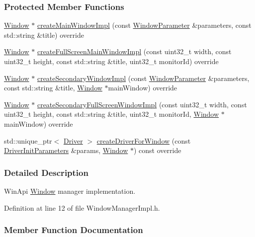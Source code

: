 \subsubsection*{Protected Member Functions}
\begin{DoxyCompactItemize}
\item 
\hyperlink{a00082}{Window} $\ast$ \hyperlink{a00088_a4c3adbbf883d7bbc15e17cc4c868ee14}{create\+Main\+Window\+Impl} (const \hyperlink{a00091}{Window\+Parameter} \&parameters, const std\+::string \&title) override
\item 
\hyperlink{a00082}{Window} $\ast$ \hyperlink{a00088_a9684f59d2995f89182e039e7591a59cc}{create\+Full\+Screen\+Main\+Window\+Impl} (const uint32\+\_\+t width, const uint32\+\_\+t height, const std\+::string \&title, uint32\+\_\+t monitor\+Id) override
\item 
\hyperlink{a00082}{Window} $\ast$ \hyperlink{a00088_ac82c286d1666a12ea3fa807958ff546d}{create\+Secondary\+Window\+Impl} (const \hyperlink{a00091}{Window\+Parameter} \&parameters, const std\+::string \&title, \hyperlink{a00082}{Window} $\ast$main\+Window) override
\item 
\hyperlink{a00082}{Window} $\ast$ \hyperlink{a00088_acb25d1f39aec8507fd80bdff20d7abc3}{create\+Secondary\+Full\+Screen\+Window\+Impl} (const uint32\+\_\+t width, const uint32\+\_\+t height, const std\+::string \&title, uint32\+\_\+t monitor\+Id, \hyperlink{a00082}{Window} $\ast$main\+Window) override
\item 
std\+::unique\+\_\+ptr$<$ \hyperlink{a00024}{Driver} $>$ \hyperlink{a00088_aced29776a0025033bb3fb92a821a5deb}{create\+Driver\+For\+Window} (const \hyperlink{a00028}{Driver\+Init\+Parameters} \&params, \hyperlink{a00082}{Window} $\ast$) const  override
\end{DoxyCompactItemize}


\subsubsection{Detailed Description}
Win\+Api \hyperlink{a00082}{Window} manager implementation. 

Definition at line 12 of file Window\+Manager\+Impl.\+h.



\subsubsection{Member Function Documentation}
